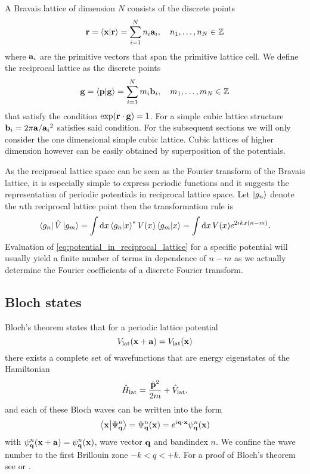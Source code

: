 A Bravais lattice of dimension $N$ consists of the discrete points
\begin{equation}
  \vb{r}
  =\bra{\vb{x}}\ket{\vb{r}}
  =\sum_{i=1}^Nn_i\vb{a}_i
  \qc n_1,\dots,n_N\in\mathbb{Z}
\end{equation}
where $\vb{a}_i$ are the primitive vectors that span the primitive lattice
cell. We define the reciprocal lattice as the discrete points
\begin{equation}
  \vb{g}
  =\bra{\vb{p}}\ket{\vb{g}}
  =\sum_{i=1}^Nm_i\vb{b}_i
  \qc m_1,\dots,m_N\in\mathbb{Z}
\end{equation}
that satisfy the condition $\exp(\vb{r}\cdot\vb{g})=1$. For a simple cubic
lattice structure $\vb{b}_i=2\pi\vb{a}/{{\vb{a}_i}^2}$ satisfies said
condition. For the subsequent sections we will only consider the one
dimensional simple cubic lattice. Cubic lattices of higher dimension however
can be easily obtained by superposition of the potentials.

As the reciprocal lattice space can be seen as the Fourier transform of the
Bravais lattice, it is especially simple to express periodic functions and it
suggests the representation of periodic potentials in reciprocal lattice
space. Let $\ket{g_n}$ denote the $n$th reciprocal lattice point then the
transformation rule is
\begin{equation}
  \bra{g_n}\hat{V}\ket{g_m}
  =\int\dd{x}\bra{g_n}\ket{x}^*V(x)\bra{g_m}\ket{x}
  =\int\dd{x}V(x)e^{2ikx(n-m)}
  \label{eq:potential_in_reciprocal_lattice}.
\end{equation}
Evaluation of \cref{eq:potential_in_reciprocal_lattice} for a specific
potential will usually yield a finite number of terms in dependence of
$n-m$ as we actually determine the Fourier coefficients of a discrete Fourier
transform.

\subsection{Bloch states}

Bloch's theorem states that for a periodic lattice potential
\begin{equation}
  V_\text{lat}(\vb{x}+\vb{a})=V_\text{lat}(\vb{x})
  \label{eq:potential_periodic}
\end{equation}
there exists a complete set of wavefunctions that are energy eigenstates
of the Hamiltonian
\begin{equation}
  \hat{H}_\text{lat}
  =\frac{\hat{\vb{p}}^2}{2m}+\hat{V}_\text{lat}
  \label{eq:hamiltonian_periodic},
\end{equation}
and each of these Bloch waves can be written into the form
\begin{equation}
  \bra{\vb{x}}\ket{\Psi^n_{\vb{q}}}
  =\Psi^n_{\vb{q}}(\vb{x})
  =e^{i\vb{q}\cdot\vb{x}}\psi^n_{\vb{q}}(\vb{x})
  \label{eq:state_bloch}
\end{equation}
with $\psi^n_{\vb{q}}(\vb{x}+\vb{a})=\psi^n_{\vb{q}}(\vb{x})$, wave vector
$\vb{q}$ and bandindex $n$. We confine the wave number to the first Brillouin
zone $-k<q<+k$. For a proof of Bloch's theorem see \cite{Roessler2004} or
\cite{Bartelmann2018}.


